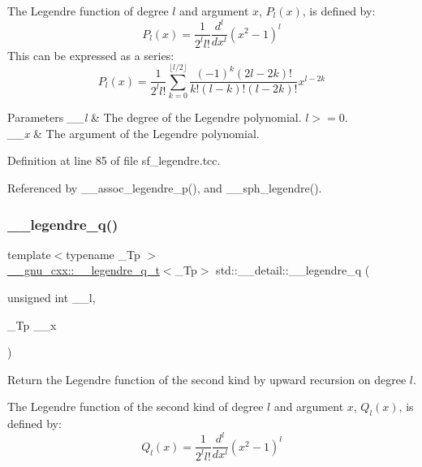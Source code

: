 The Legendre function of degree $ l $ and argument $ x $, $ P_l(x) $, is defined by\+: \[ P_l(x) = \frac{1}{2^l l!}\frac{d^l}{dx^l}(x^2 - 1)^{l} \] This can be expressed as a series\+: \[ P_l(x) = \frac{1}{2^l l!}\sum_{k=0}^{\lfloor l/2 \rfloor} \frac{(-1)^k(2l-2k)!}{k!(l-k)!(l-2k)!}x^{l-2k} \]


\begin{DoxyParams}{Parameters}
{\em \+\_\+\+\_\+l} & The degree of the Legendre polynomial. $ l >= 0 $. \\
\hline
{\em \+\_\+\+\_\+x} & The argument of the Legendre polynomial. \\
\hline
\end{DoxyParams}


Definition at line 85 of file sf\+\_\+legendre.\+tcc.



Referenced by \+\_\+\+\_\+assoc\+\_\+legendre\+\_\+p(), and \+\_\+\+\_\+sph\+\_\+legendre().

\mbox{\label{namespacestd_1_1____detail_aa3260951fa25185d757b65145fb1d3c9}} 
\subsubsection{\texorpdfstring{\+\_\+\+\_\+legendre\+\_\+q()}{\_\_legendre\_q()}}
{\footnotesize\ttfamily template$<$typename \+\_\+\+Tp $>$ \\
\hyperlink{struct____gnu__cxx_1_1____legendre__q__t}{\+\_\+\+\_\+gnu\+\_\+cxx\+::\+\_\+\+\_\+legendre\+\_\+q\+\_\+t}$<$\+\_\+\+Tp$>$ std\+::\+\_\+\+\_\+detail\+::\+\_\+\+\_\+legendre\+\_\+q (\begin{DoxyParamCaption}\item[{unsigned int}]{\+\_\+\+\_\+l,  }\item[{\+\_\+\+Tp}]{\+\_\+\+\_\+x }\end{DoxyParamCaption})}



Return the Legendre function of the second kind by upward recursion on degree $ l $. 

The Legendre function of the second kind of degree $ l $ and argument $ x $, $ Q_l(x) $, is defined by\+: \[ Q_l(x) = \frac{1}{2^l l!}\frac{d^l}{dx^l}(x^2 - 1)^{l} \]


